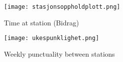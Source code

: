 \begin{figure}[!htbp]
	\texttt{[image: stasjonsoppholdplott.png]}
	\caption[Time at station (Bidrag)]{Time at station (Bidrag) \cite{sintefPresis}}
	\label{fig:stasjonsoppholdplott}
\end{figure}
\pagebreak

\begin{figure}[!htbp]
	\texttt{[image: ukespunklighet.png]}
	\caption[Weekly punctuality between stations]{Weekly punctuality between stations \cite{sintefPresis}}
	\label{fig:ukespunklighet}
\end{figure}
\pagebreak
